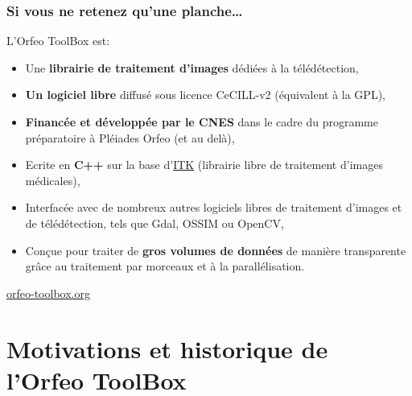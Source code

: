 \documentclass[8pt]{beamer}
\begin{document}
\begin{frame}
\frametitle{Si vous ne retenez qu'une planche\ldots}
\begin{block}{L'Orfeo ToolBox est:}
\begin{itemize}
\item Une \textbf{librairie de traitement d'images} dédiées à la télédétection,
\item \textbf{Un logiciel libre} diffusé sous licence CeCILL-v2 (équivalent à la GPL),
\item \textbf{Financée et développée par le CNES} dans le cadre du programme préparatoire à Pléiades Orfeo (et au delà),
\item Ecrite en \textbf{C++} sur la base d'\href{www.itk.org}{ITK} (librairie libre de traitement d'images médicales),
\item Interfacée avec de nombreux autres logiciels libres de traitement d'images et de télédétection, tels que Gdal, OSSIM ou OpenCV,
\item Conçue pour traiter de \textbf{gros volumes de données} de manière transparente grâce au traitement par morceaux et à la parallélisation.
\end{itemize}
\end{block}

\begin{center}
{\huge\textcolor{red}{\href{http://www.orfeo-toolbox.org}{orfeo-toolbox.org}}}
\end{center}

\end{frame}

\section{Motivations et historique de l'Orfeo ToolBox}
\end{document}
